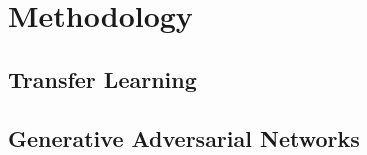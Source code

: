 \section{Methodology}

\subsection{Transfer Learning}

\lipsum[3]

\subsection{Generative Adversarial Networks}

\lipsum[1]